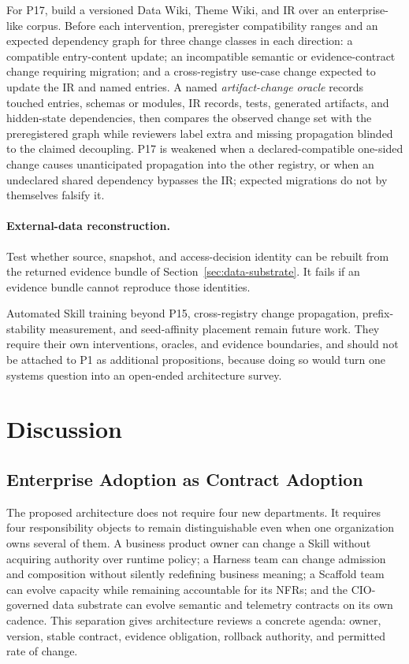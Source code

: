 \documentclass[11pt]{article}
\begin{document}
For P17, build a versioned Data Wiki, Theme Wiki, and IR over an enterprise-like corpus. Before each intervention, preregister compatibility ranges and an expected dependency graph for three change classes in each direction: a compatible entry-content update; an incompatible semantic or evidence-contract change requiring migration; and a cross-registry use-case change expected to update the IR and named entries. A named \textit{artifact-change oracle} records touched entries, schemas or modules, IR records, tests, generated artifacts, and hidden-state dependencies, then compares the observed change set with the preregistered graph while reviewers label extra and missing propagation blinded to the claimed decoupling. P17 is weakened when a declared-compatible one-sided change causes unanticipated propagation into the other registry, or when an undeclared shared dependency bypasses the IR; expected migrations do not by themselves falsify it.

\paragraph{External-data reconstruction.}
Test whether source, snapshot, and access-decision identity can be rebuilt from the returned evidence bundle of Section~\ref{sec:data-substrate}. It fails if an evidence bundle cannot reproduce those identities.

Automated Skill training beyond P15, cross-registry change propagation, prefix-stability measurement, and seed-affinity placement remain future work. They require their own interventions, oracles, and evidence boundaries, and should not be attached to P1 as additional propositions, because doing so would turn one systems question into an open-ended architecture survey.

\section{Discussion}
\label{sec:discussion}

\subsection{Enterprise Adoption as Contract Adoption}

The proposed architecture does not require four new departments. It requires four responsibility objects to remain distinguishable even when one organization owns several of them. A business product owner can change a Skill without acquiring authority over runtime policy; a Harness team can change admission and composition without silently redefining business meaning; a Scaffold team can evolve capacity while remaining accountable for its NFRs; and the CIO-governed data substrate can evolve semantic and telemetry contracts on its own cadence. This separation gives architecture reviews a concrete agenda: owner, version, stable contract, evidence obligation, rollback authority, and permitted rate of change.
\end{document}
